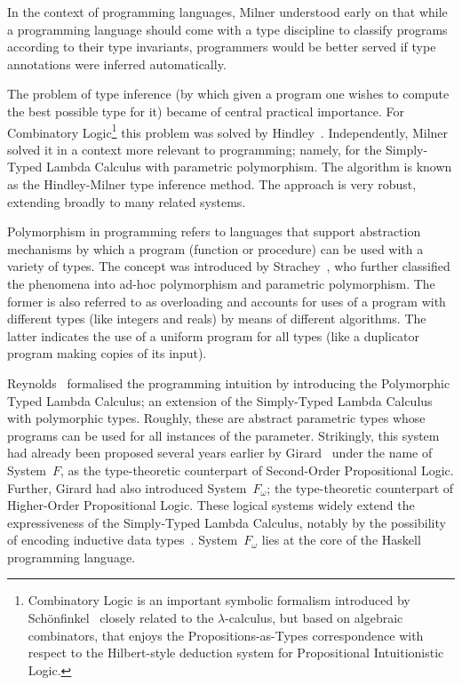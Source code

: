\documentclass[11pt,twocolumn]{article}
\newcommand{\lcalculus}{\mbox{$\lambda$-calculus}}
\newcommand{\SystemF}{\mbox{System~$F$}}
\newcommand{\SystemFomega}{\mbox{System~$F_\omega$}}
\begin{document}
In the context of programming languages, Milner %
understood early on that while a programming language should come with a
type discipline to classify programs according to their type invariants,
programmers would be better served if type annotations were inferred
automatically.  

The problem of type inference (by which given a program one wishes to compute
the best possible type for it) became of central practical importance.  For
Combinatory Logic\footnote{Combinatory Logic is an important symbolic
  formalism introduced by Sch\"onfinkel~\cite{Schonfinkel} closely related
  to the {\lcalculus}, but based on algebraic combinators, that enjoys the
  Propositions-as-Types correspondence with respect to the Hilbert-style
  deduction system for Propositional Intuitionistic %
  Logic.} 
this problem was solved by Hindley~\cite{Hindley1969}.  Independently,
Milner~\cite{Milner1978} solved it in a context more relevant to
programming; namely, for the Simply-Typed Lambda Calculus with parametric
polymorphism.  The algorithm is known as the Hindley-Milner type
inference method.  The approach is very robust, extending broadly to
many related systems.
 
Polymorphism in programming refers to languages that support abstraction
mechanisms by which a program (function or procedure) can be used with a
variety of types.  The concept was introduced by Strachey~\cite{Strachey1967},
who further classified the phenomena into ad-hoc polymorphism and parametric polymorphism.
The former is also referred to as overloading and accounts for uses of a
program with different types (like integers and reals) by means of different
algorithms.  The latter indicates the use of a uniform program for all types
(like a duplicator program making copies of its input).

Reynolds~\cite{Reynolds} formalised the programming intuition by introducing
the Polymorphic Typed Lambda Calculus; an extension of the Simply-Typed Lambda
Calculus with polymorphic types.  Roughly, these are abstract parametric types
whose programs can be used for all instances of the parameter.  Strikingly,
this system had already been proposed several years earlier by
Girard~\cite{GirardSystemF} under the name of {\SystemF}, as the
type-theoretic counterpart of Second-Order Propositional Logic.
Further, Girard had
also introduced {\SystemFomega}; the type-theoretic counterpart of
Higher-Order Propositional Logic.  These logical systems widely extend the
expressiveness of the Simply-Typed Lambda Calculus, notably by the
possibility of encoding inductive data types~\cite{BoehmBerarducci}.
{\SystemFomega} lies at the core of the Haskell programming
language. %
\end{document}
